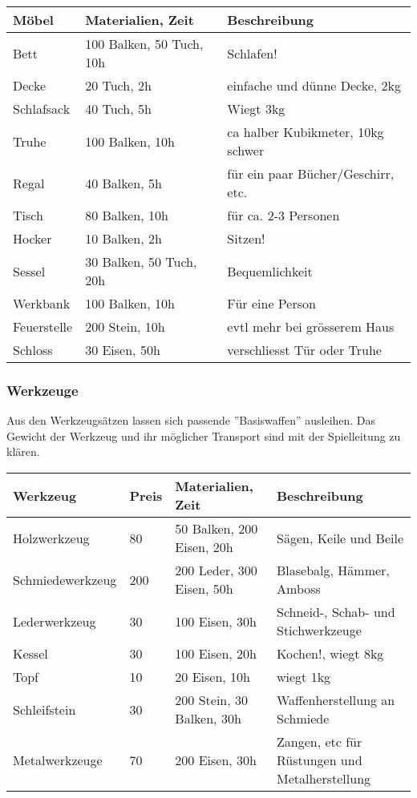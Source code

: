 \documentclass{article}
\begin{document}
\begin{small}
\begin{tabular}{|m{3cm}|m{4cm}|m{6cm}|}
\hline
\textbf{Möbel}&\textbf{Materialien, Zeit}&\textbf{Beschreibung}\\
\hline
\hline
Bett&100 Balken, 50 Tuch, 10h&Schlafen!\\
\hline
Decke&20 Tuch, 2h&einfache und dünne Decke, 2kg\\
\hline
Schlafsack&40 Tuch, 5h&Wiegt 3kg\\
\hline
Truhe&100 Balken, 10h&ca halber Kubikmeter, 10kg schwer\\
\hline
Regal&40 Balken, 5h&für ein paar Bücher/Geschirr, etc.\\
\hline
Tisch&80 Balken, 10h&für ca. 2-3 Personen\\
\hline
Hocker&10 Balken, 2h&Sitzen!\\
\hline
Sessel&30 Balken, 50 Tuch, 20h&Bequemlichkeit\\
\hline
Werkbank&100 Balken, 10h&Für eine Person\\
\hline
Feuerstelle&200 Stein, 10h&evtl mehr bei grösserem Haus\\
\hline
Schloss&30 Eisen, 50h&verschliesst Tür oder Truhe\\
\hline
\end{tabular}
\end{small}

\subsubsection{Werkzeuge}

Aus den Werkzeugsätzen lassen sich passende ''Basiswaffen'' ausleihen. Das Gewicht der Werkzeug und ihr möglicher
Transport sind mit der Spielleitung zu klären.


\begin{small}
\begin{tabular}{|m{3cm}|m{1cm}|m{4cm}|m{6cm}|}
\hline
\textbf{Werkzeug}&\textbf{Preis}&\textbf{Materialien, Zeit}&\textbf{Beschreibung}\\
\hline
\hline
Holzwerkzeug&80&50 Balken, 200 Eisen, 20h&Sägen, Keile und Beile\\
\hline
Schmiedewerkzeug&200&200 Leder, 300 Eisen, 50h&Blasebalg, Hämmer, Amboss\\
\hline
Lederwerkzeug&30&100 Eisen, 30h&Schneid-, Schab- und Stichwerkzeuge\\
\hline
Kessel&30&100 Eisen, 20h&Kochen!, wiegt 8kg\\
\hline
Topf&10&20 Eisen, 10h&wiegt 1kg\\
\hline
Schleifstein&30&200 Stein, 30 Balken, 30h&Waffenherstellung an Schmiede\\
\hline
Metalwerkzeuge&70&200 Eisen, 30h&Zangen, etc für Rüstungen und Metalherstellung\\
\hline
\end{tabular}
\end{small}
\end{document}
